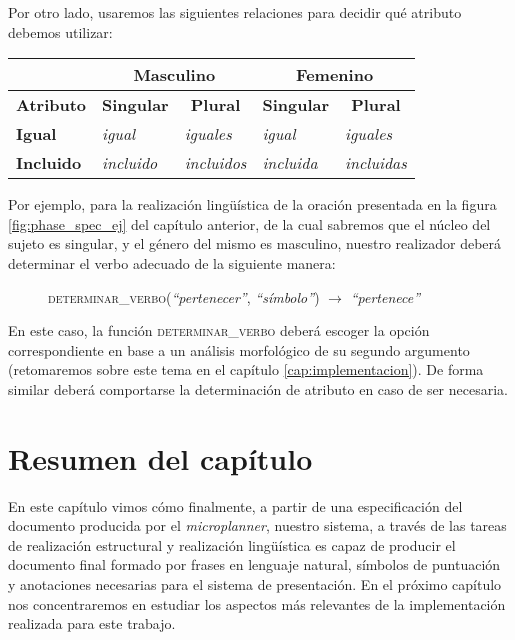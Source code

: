 \noindent
Por otro lado, usaremos las siguientes relaciones para decidir qué atributo debemos utilizar:

\begin{table}[H]
\centering
\begin{tabular}{l|l|l|l|l|}
\cline{2-5}
                                 & \multicolumn{2}{c|}{\textbf{Masculino}}                                       & \multicolumn{2}{c|}{\textbf{Femenino}}                                        \\ \hline
\multicolumn{1}{|c|}{\textbf{Atributo}} & \multicolumn{1}{c|}{\textbf{Singular}} & \multicolumn{1}{c|}{\textbf{Plural}} & \multicolumn{1}{c|}{\textbf{Singular}} & \multicolumn{1}{c|}{\textbf{Plural}} \\ \hline
\multicolumn{1}{|l|}{\textbf{Igual}}    & \textit{igual}                                  & \textit{iguales}                              & \textit{igual}                                  & \textit{iguales}                              \\ \hline
\multicolumn{1}{|l|}{\textbf{Incluido}} & \textit{incluido}                               & \textit{incluidos}                            & \textit{incluida}                               & \textit{incluidas}                            \\ \hline
\end{tabular}
\end{table}

Por ejemplo, para la realización lingüística de la oración presentada en la figura \ref{fig:phase_spec_ej} del capítulo anterior, de la cual sabremos que el núcleo del sujeto es singular, y el género del mismo es masculino, nuestro realizador deberá determinar el verbo adecuado de la siguiente manera:

\begin{figure}[H]
\centering
\textsc{determinar\_verbo}(\emph{``pertenecer''}, \emph{``símbolo''}) $\rightarrow$ \emph{``pertenece''}
\end{figure}

\noindent
En este caso, la función \textsc{determinar\_verbo} deberá escoger la opción correspondiente en base a un análisis morfológico de su segundo argumento (retomaremos sobre este tema en el capítulo \ref{cap:implementacion}). De forma similar deberá comportarse la determinación de atributo en caso de ser necesaria. 

\section{Resumen del capítulo}
En este capítulo vimos cómo finalmente, a partir de una especificación del documento producida por el \textit{microplanner}, nuestro sistema, a través de las tareas de realización estructural y realización lingüística es capaz de producir el documento final formado por frases en lenguaje natural, símbolos de puntuación y anotaciones necesarias para el sistema de presentación. En el próximo capítulo nos concentraremos en estudiar los aspectos más relevantes de la implementación realizada para este trabajo.